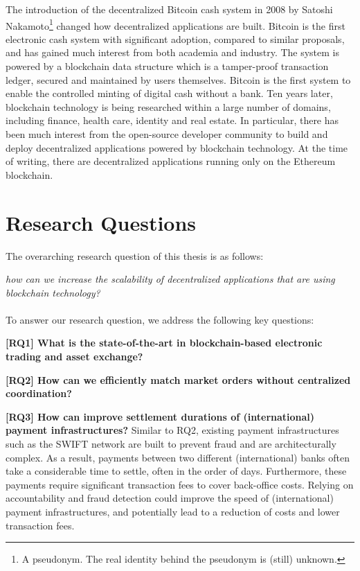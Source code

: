 The introduction of the decentralized Bitcoin cash system in 2008 by Satoshi Nakamoto\footnote{A pseudonym. The real identity behind the pseudonym is (still) unknown.} changed how decentralized applications are built.
Bitcoin is the first electronic cash system with significant adoption, compared to similar proposals, and has gained much interest from both academia and industry.
The system is powered by a blockchain data structure which is a tamper-proof transaction ledger, secured and maintained by users themselves.
Bitcoin is the first system to enable the controlled minting of digital cash without a bank.
Ten years later, blockchain technology is being researched within a large number of domains, including finance, health care, identity and real estate.
In particular, there has been much interest from the open-source developer community to build and deploy decentralized applications powered by blockchain technology.
At the time of writing, there are  decentralized applications running only on the Ethereum blockchain.



\section{Research Questions}

The overarching research question of this thesis is as follows:

\emph{how can we increase the scalability of decentralized applications that are using blockchain technology?}\\\\
To answer our research question, we address the following key questions:

\textbf{[RQ1] What is the state-of-the-art in blockchain-based electronic trading and asset exchange?}

\textbf{[RQ2] How can we efficiently match market orders without centralized coordination?}

\textbf{[RQ3] How can improve settlement durations of (international) payment infrastructures?}
Similar to RQ2, existing payment infrastructures such as the SWIFT network are built to prevent fraud and are architecturally complex.
As a result, payments between two different (international) banks often take a considerable time to settle, often in the order of days.
Furthermore, these payments require significant transaction fees to cover back-office costs.
Relying on accountability and fraud detection could improve the speed of (international) payment infrastructures, and potentially lead to a reduction of costs and lower transaction fees.

